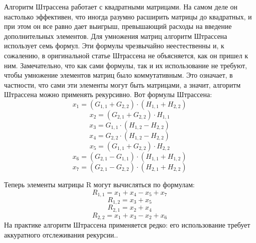 Алгоритм Штрассена работает с квадратными матрицами. На самом деле он настолько эффективен, что иногда разумно расширить матрицы до квадратных, и при этом он все равно дает выигрыш, превышающий расходы на введение дополнительных элементов.
Для умножения матриц алгоритм Штрассена использует семь формул. Эти формулы чрезвычайно неестественны и, к сожалению, в оригинальной статье Штрассена не объясняется, как он пришел к ним. Замечательно, что как сами формулы, так и их использование не требуют, чтобы умножение элементов матриц было коммутативным. Это означает, в частности, что сами эти элементы могут быть матрицами, а значит, алгоритм Штрассена можно применять рекурсивно. Вот формулы Штрассена:
\begin{equation}
	\label{eq:ST1}
	x_1 = (G_{1,1} + G_{2,2}) \cdot (H_{1,1} + H_{2,2})
\end{equation}
\begin{equation}
	\label{eq:ST2}
	x_2 = (G_{2,1} + G_{2,2}) \cdot H_{1,1}
\end{equation}
\begin{equation}
	\label{eq:ST3}
	x_3 = G_{1,1} \cdot (H_{1,2} - H_{2,2})
\end{equation}
\begin{equation}
	\label{eq:ST4}
	x_4 = G_{2,2} \cdot (H_{1,2} - H_{2,2})
\end{equation}
\begin{equation}
	\label{eq:ST5}
	x_5 = (G_{1,1} + G_{2,2}) \cdot H_{2,2}
\end{equation}
\begin{equation}
	\label{eq:ST6}
	x_6 = (G_{2,1} - G_{1,1}) \cdot (H_{1,1} + H_{1,2})
\end{equation}
\begin{equation}
	\label{eq:ST7}
	x_7 = (G_{2,1} - G_{2,2}) \cdot (H_{2,1} + H_{2,2})
\end{equation}

Теперь элементы матрицы R могут вычисляться по формулам:
\begin{equation}
	\label{eq:ST8}
	R_{1,1} = x_1 + x_4 - x_5 + x_7
\end{equation}
\begin{equation}
	\label{eq:ST9}
	R_{1,2} = x_3 + x_5
\end{equation}
\begin{equation}
	\label{eq:ST10}
	R_{2,1} = x_2 + x_4
\end{equation}
\begin{equation}
	\label{eq:ST11}
	R_{2,2} = x_1 + x_3 - x_2 + x_6
\end{equation}
На практике алгоритм Штрассена применяется редко: его использование требует аккуратного отслеживания рекурсии.\cite{alg2}.
